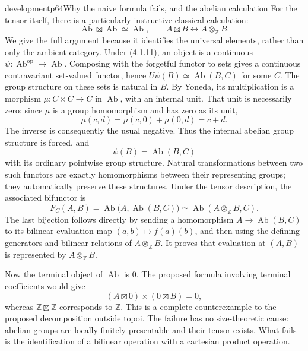 \begin{dcomment}{development}{p64}{Why the naive formula fails, and the abelian calculation}
For the tensor itself, there is a particularly instructive classical calculation:
\[
 \operatorname{Ab}\boxtimes\operatorname{Ab}\simeq\operatorname{Ab},
 \qquad A\boxtimes B\longleftrightarrow A\otimes_{\mathbb Z}B.
\]
We give the full argument because it identifies the universal elements, rather than only the ambient category. Under (4.1.11), an object is a continuous $\psi:\operatorname{Ab}^{\mathrm{op}}\to\operatorname{Ab}$. Composing with the forgetful functor to sets gives a continuous contravariant set-valued functor, hence $U\psi(B)\simeq\operatorname{Ab}(B,C)$ for some $C$. The group structure on these sets is natural in $B$. By Yoneda, its multiplication is a morphism $\mu:C\times C\to C$ in $\operatorname{Ab}$, with an internal unit. That unit is necessarily zero; since $\mu$ is a group homomorphism and has zero as its unit,
\[
 \mu(c,d)=\mu(c,0)+\mu(0,d)=c+d.
\]
The inverse is consequently the usual negative. Thus the internal abelian group structure is forced, and
\[
 \psi(B)=\operatorname{Ab}(B,C)
\]
with its ordinary pointwise group structure. Natural transformations between two such functors are exactly homomorphisms between their representing groups; they automatically preserve these structures. Under the tensor description, the associated bifunctor is
\[
 F_C(A,B)=\operatorname{Ab}\bigl(A,\operatorname{Ab}(B,C)\bigr)
 \simeq\operatorname{Ab}(A\otimes_{\mathbb Z}B,C).
\]
The last bijection follows directly by sending a homomorphism $A\to\operatorname{Ab}(B,C)$ to its bilinear evaluation map $(a,b)\mapsto f(a)(b)$, and then using the defining generators and bilinear relations of $A\otimes_{\mathbb Z}B$. It proves that evaluation at $(A,B)$ is represented by $A\otimes_{\mathbb Z}B$.

Now the terminal object of $\operatorname{Ab}$ is $0$. The proposed formula involving terminal coefficients would give
\[
 (A\boxtimes0)\times(0\boxtimes B)=0,
\]
whereas $\mathbb Z\boxtimes\mathbb Z$ corresponds to $\mathbb Z$. This is a complete counterexample to the proposed decomposition outside topoi. The failure has no size-theoretic cause: abelian groups are locally finitely presentable and their tensor exists. What fails is the identification of a bilinear operation with a cartesian product operation.
\end{dcomment}

